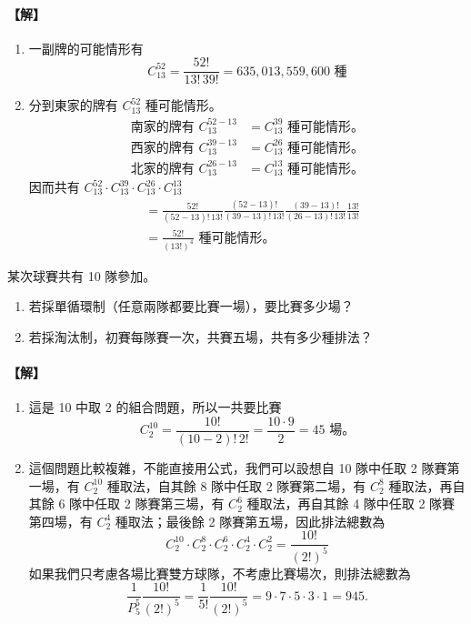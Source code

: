 \paragraph{【解】}
\begin{enumerate}[label=(\roman*), topsep=2pt, itemsep=4pt]
  \item 一副牌的可能情形有
  \[
  C_{13}^{52} = \frac{52!}{13!\, 39!} = 635{,}013{,}559{,}600 \text{ 種}
  \]
  \item 分到東家的牌有 $C_{13}^{52}$ 種可能情形。
  \begin{align*}
  \text{南家的牌有 } C_{13}^{52-13} &= C_{13}^{39} \text{ 種可能情形。} \\
  \text{西家的牌有 } C_{13}^{39-13} &= C_{13}^{26} \text{ 種可能情形。} \\
  \text{北家的牌有 } C_{13}^{26-13} &= C_{13}^{13} \text{ 種可能情形。}
  \end{align*}
  因而共有 $C_{13}^{52} \cdot C_{13}^{39} \cdot C_{13}^{26} \cdot C_{13}^{13}$
  \begin{align*}
  &= \frac{52!}{(52-13)!\, 13!} \frac{(52-13)!}{(39-13)!\, 13!} \frac{(39-13)!}{(26-13)!\, 13!} \frac{13!}{13!} \\
  &= \frac{52!}{(13!)^4} \text{ 種可能情形。}
  \end{align*}
\end{enumerate}

\medskip
\begin{example}\label{ex:b5-2-16}
某次球賽共有 10 隊參加。
\begin{enumerate}[label=(\roman*), topsep=2pt, itemsep=4pt]
  \item 若採單循環制（任意兩隊都要比賽一場），要比賽多少場？
  \item 若採淘汰制，初賽每隊賽一次，共賽五場，共有多少種排法？
\end{enumerate}
\end{example}
\paragraph{【解】}
\begin{enumerate}[label=(\roman*), topsep=2pt, itemsep=4pt]
  \item 這是 10 中取 2 的組合問題，所以一共要比賽
  \[
  C_2^{10} = \frac{10!}{(10-2)!\, 2!} = \frac{10 \cdot 9}{2} = 45 \text{ 場。}
  \]
  \item 這個問題比較複雜，不能直接用公式，我們可以設想自 10 隊中任取 2 隊賽第一場，有 $C_2^{10}$ 種取法，自其餘 8 隊中任取 2 隊賽第二場，有 $C_2^8$ 種取法，再自其餘 6 隊中任取 2 隊賽第三場，有 $C_2^6$ 種取法，再自其餘 4 隊中任取 2 隊賽第四場，有 $C_2^4$ 種取法；最後餘 2 隊賽第五場，因此排法總數為
  \[
  C_2^{10} \cdot C_2^8 \cdot C_2^6 \cdot C_2^4 \cdot C_2^2 = \frac{10!}{(2!)^5}
  \]
  如果我們只考慮各場比賽雙方球隊，不考慮比賽場次，則排法總數為
  \[
  \frac{1}{P_5^5} \frac{10!}{(2!)^5} = \frac{1}{5!} \frac{10!}{(2!)^5} = 9 \cdot 7 \cdot 5 \cdot 3 \cdot 1 = 945. \tag*{$\#$}
  \]
\end{enumerate}


